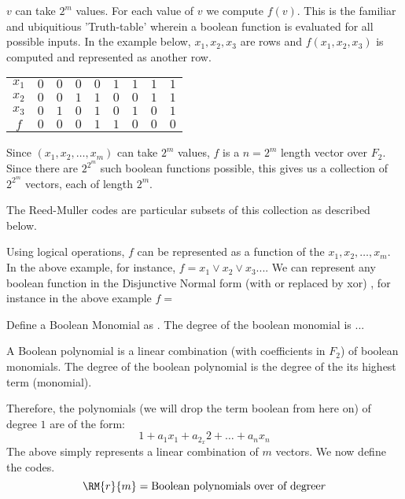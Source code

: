 $v$ can take $2^m$ values. For each value of $v$ we compute $f(v)$. This is the familiar and ubiquitious 'Truth-table' wherein a boolean function is evaluated for all possible inputs.
In the example below, $x_1, x_2, x_3$ are rows and $f(x_1, x_2, x_3)$ is computed and represented as another row. 
\begin {center}
\begin{tabular}{|c|c|c|c|c|c|c|c|c|}
$x_1$ & $0$ & $0$ & $0$ & $0$ & $1$ & $1$ & $1$ & $1$ \\
$x_2$ & $0$ & $0$ & $1$ & $1$ & $0$ & $0$ & $1$ & $1$ \\
$x_3$ & $0$ & $1$ & $0$ & $1$ & $0$ & $1$ & $0$ & $1$ \\
$f$   & $0$ & $0$ & $0$ & $1$ & $1$ & $0$ & $0$ & $0$ \\

\end{tabular}
\end{center} 

Since $(x_1,x_2,\ldots,x_m)$ can take $2^m$ values, $f$ is a $n=2^m$ length vector over $F_2$. Since there are $2^2^m$ such boolean functions possible, this gives us a collection of  $2^2^m$ vectors, each of length $2^m$.
 
The Reed-Muller codes are particular subsets of this collection as described below.

Using logical operations, $f$ can be represented as a function of the $x_1, x_2, \ldots , x_m$. In the above example, for instance, $f = x_1 \vee x_2 \vee x_3 ... $. We can represent any boolean function in the Disjunctive Normal form (with or replaced by xor) \cite{Problem2}, for instance in the above example $f = $

Define a Boolean Monomial as .
The degree of the boolean monomial is ...

A Boolean polynomial is a linear combination (with coefficients in $F_2$) of boolean monomials. The degree of the boolean polynomial is the degree of the its highest term (monomial).

Therefore, the polynomials (we will drop the term boolean from here on) of degree $1$ are of the form:
\begin{equation}
 1+a_1x_1+a_2_x2+\ldots+a_nx_n
\end{equation}
The above simply represents a linear combination of $m$ vectors.
We now define the \rm codes.
\begin{equation}

\RM{r}{m} = \text{Boolean polynomials over of degree} r
\end{equation}

